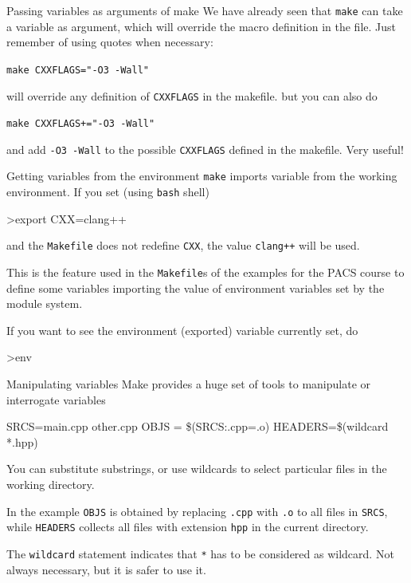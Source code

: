 \documentclass[10pt,aspectratio=169]{beamer}
\begin{document}
\begin{frame}{Passing variables as arguments of make}
    We have already seen that \texttt{make} can take a variable as argument, which will override the macro
    definition in the file.  Just remember of using quotes when necessary:
    
    \begin{center}
        \texttt{make CXXFLAGS="-O3 -Wall"} 
    \end{center}
    will override any definition of \texttt{CXXFLAGS} in the makefile.
    \medskip
    but you can also do
    \begin{center}
        \texttt{make CXXFLAGS+="-O3 -Wall"} 
    \end{center}
    and add \texttt{-O3 -Wall} to the possible \texttt{CXXFLAGS} defined in the makefile.
    \alert{Very useful!}
  \end{frame}


\begin{frame}{Getting variables from the environment}
\texttt{make} imports variable from the working environment. If you set (using \texttt{bash} shell)
\begin{semiverbatim}
    >export CXX=clang++
\end{semiverbatim}
and the \texttt{Makefile} does not redefine \texttt{CXX}, the value \texttt{clang++} will be used.
\smallskip

This is the feature used  in the \texttt{Makefile}s of the examples
for the PACS course to define some variables importing the value of environment variables set by the module system.
\smallskip

If you want to see the environment (exported) variable currently set, do
\begin{semiverbatim}
    >env
\end{semiverbatim}
    
    \end{frame}

\begin{frame}{Manipulating variables}
Make provides a huge set of tools to manipulate or interrogate variables

\begin{semiverbatim}
SRCS=main.cpp other.cpp\newline
OBJS = \$(SRCS:.cpp=.o)\newline
HEADERS=\$(wildcard *.hpp)\newline
\end{semiverbatim}

You can substitute substrings, or use wildcards to select particular files in the working directory.
\medskip

In the example \texttt{OBJS} is obtained by replacing \texttt{.cpp} with \texttt{.o} to all files in \texttt{SRCS},
while \texttt{HEADERS} collects all files with extension \texttt{hpp} in the current directory.

The \texttt{wildcard} statement indicates that \texttt{*} has to be considered as wildcard. Not always necessary, but it is safer to use it.
\end{frame}
\end{document}

